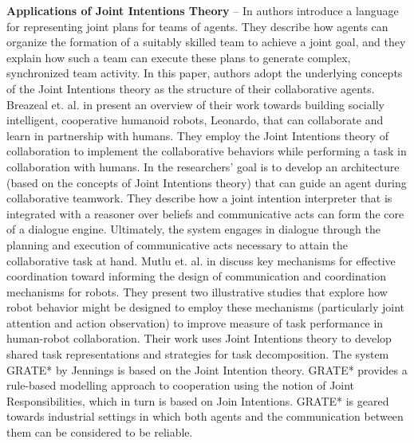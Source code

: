 \textbf{Applications of Joint Intentions Theory} -- In \cite{kinny:planned-team}
authors introduce a language for representing joint plans for teams of agents.
They describe how agents can organize the formation of a suitably skilled team
to achieve a joint goal, and they explain how such a team can execute these
plans to generate complex, synchronized team activity. In this paper, authors
adopt the underlying concepts of the Joint Intentions theory as the structure of
their collaborative agents. Breazeal et. al. in \cite{breazeal:humanoid-robots}
present an overview of their work towards building socially intelligent,
cooperative humanoid robots, Leonardo, that can collaborate and learn in
partnership with humans. They employ the Joint Intentions theory of
collaboration to implement the collaborative behaviors while performing a task
in collaboration with humans. In \cite{subramanian:joint-intention-dialogue}
the researchers' goal is to develop an architecture (based on the concepts of
Joint Intentions theory) that can guide an agent during collaborative teamwork.
They describe how a joint intention interpreter that is integrated with a
reasoner over beliefs and communicative acts can form the core of a dialogue
engine. Ultimately, the system engages in dialogue through the planning and
execution of communicative acts necessary to attain the collaborative task at
hand. Mutlu et. al. in \cite{mutlu:coordination-robot} discuss key mechanisms
for effective coordination toward informing the design of communication and
coordination mechanisms for robots. They present two illustrative studies that
explore how robot behavior might be designed to employ these mechanisms
(particularly joint attention and action observation) to improve measure of task
performance in human-robot collaboration. Their work uses Joint Intentions
theory to develop shared task representations and strategies for task
decomposition. The system GRATE* by Jennings
\cite{jennings:joint-intention-hybrid} is based on the Joint Intention theory.
GRATE* provides a rule-based modelling approach to cooperation using the notion
of Joint Responsibilities, which in turn is based on Join Intentions. GRATE* is
geared towards industrial settings in which both agents and the communication
between them can be considered to be reliable.\\

